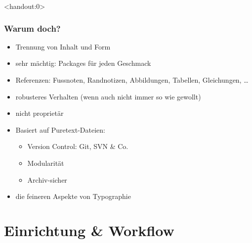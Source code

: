 \documentclass{beamer}                %
\begin{document}
\begin{frame}<handout:0>
    \frametitle{Warum doch?}
    \begin{itemize}
        \item
            Trennung von Inhalt und Form 
        \item
            sehr m\"achtig: Packages f\"ur jeden Geschmack
        \item
            Referenzen: Fussnoten,    Randnotizen,   Abbildungen,    Tabellen,
            Gleichungen, \ldots
        \item
            robusteres Verhalten (wenn auch nicht immer so wie gewollt)
        \item
            nicht propriet\"ar
        \item
            Basiert auf Puretext-Dateien:
            \begin{itemize}
                \item
                    Version Control: Git, SVN \& Co.
                \item
                    Modularit\"at
                \item
                    Archiv-sicher
            \end{itemize}
        \item
            die feineren Aspekte von Typographie
    \end{itemize}
\end{frame}

\section<handout:0>{Einrichtung \& Workflow} %
\end{document}
